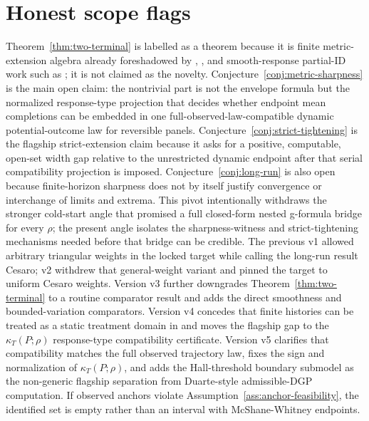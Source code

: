 \documentclass[11pt]{article}
\theoremstyle{definition}
\theoremstyle{plain}
\theoremstyle{remark}
\begin{document}
\section{Honest scope flags}
Theorem~\ref{thm:two-terminal} is labelled as a theorem because it is finite metric-extension algebra already foreshadowed by \citet{McShane1934}, \citet{Whitney1934}, and smooth-response partial-ID work such as \citet{KimKwonKwonLee2018}; it is not claimed as the novelty.  Conjecture~\ref{conj:metric-sharpness} is the main open claim: the nontrivial part is not the envelope formula but the normalized response-type projection that decides whether endpoint mean completions can be embedded in one full-observed-law-compatible dynamic potential-outcome law for reversible panels.  Conjecture~\ref{conj:strict-tightening} is the flagship strict-extension claim because it asks for a positive, computable, open-set width gap relative to the unrestricted dynamic endpoint after that serial compatibility projection is imposed.  Conjecture~\ref{conj:long-run} is also open because finite-horizon sharpness does not by itself justify convergence or interchange of limits and extrema.  This pivot intentionally withdraws the stronger cold-start angle that promised a full closed-form nested g-formula bridge for every \(\rho\); the present angle isolates the sharpness-witness and strict-tightening mechanisms needed before that bridge can be credible.  The previous v1 allowed arbitrary triangular weights in the locked target while calling the long-run result Cesaro; v2 withdrew that general-weight variant and pinned the target to uniform Cesaro weights.  Version v3 further downgrades Theorem~\ref{thm:two-terminal} to a routine comparator result and adds the direct smoothness and bounded-variation comparators.  Version v4 concedes that finite histories can be treated as a static treatment domain in \citet{KimKwonKwonLee2018} and moves the flagship gap to the \(\kappa_T(P;\rho)\) response-type compatibility certificate.  Version v5 clarifies that compatibility matches the full observed trajectory law, fixes the sign and normalization of \(\kappa_T(P;\rho)\), and adds the Hall-threshold boundary submodel as the non-generic flagship separation from Duarte-style admissible-DGP computation.  If observed anchors violate Assumption~\ref{ass:anchor-feasibility}, the identified set is empty rather than an interval with McShane-Whitney endpoints.
\end{document}

